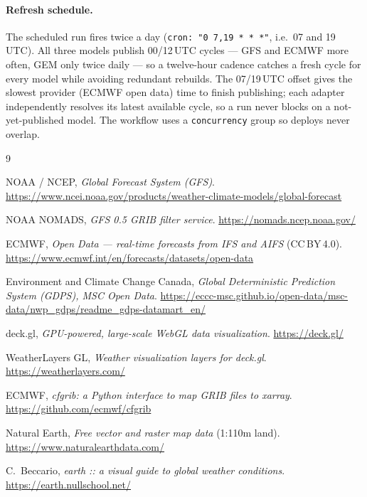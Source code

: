 \documentclass[11pt,letterpaper]{article}
\begin{document}
\paragraph{Refresh schedule.}
The scheduled run fires twice a day (\texttt{cron: "0 7,19 * * *"}, i.e.\ 07 and
19\,UTC). All three models publish 00/12\,UTC cycles --- GFS and ECMWF more often,
GEM only twice daily --- so a twelve-hour cadence catches a fresh cycle for every
model while avoiding redundant rebuilds. The 07/19\,UTC offset gives the slowest
provider (ECMWF open data) time to finish publishing; each adapter independently
resolves its latest available cycle, so a run never blocks on a not-yet-published
model. The workflow uses a \texttt{concurrency} group so deploys never overlap.

\begin{thebibliography}{9}

NOAA / NCEP, \emph{Global Forecast System (GFS)}.
\url{https://www.ncei.noaa.gov/products/weather-climate-models/global-forecast}

NOAA NOMADS, \emph{GFS 0.5\textdegree{} GRIB filter service}.
\url{https://nomads.ncep.noaa.gov/}

ECMWF, \emph{Open Data --- real-time forecasts from IFS and AIFS} (CC\,BY\,4.0).
\url{https://www.ecmwf.int/en/forecasts/datasets/open-data}

Environment and Climate Change Canada, \emph{Global Deterministic Prediction
System (GDPS), MSC Open Data}.
\url{https://eccc-msc.github.io/open-data/msc-data/nwp_gdps/readme_gdps-datamart_en/}

deck.gl, \emph{GPU-powered, large-scale WebGL data visualization}.
\url{https://deck.gl/}

WeatherLayers GL, \emph{Weather visualization layers for deck.gl}.
\url{https://weatherlayers.com/}

ECMWF, \emph{cfgrib: a Python interface to map GRIB files to xarray}.
\url{https://github.com/ecmwf/cfgrib}

Natural Earth, \emph{Free vector and raster map data} (1:110m land).
\url{https://www.naturalearthdata.com/}

C.\ Beccario, \emph{earth :: a visual guide to global weather conditions}.
\url{https://earth.nullschool.net/}

\end{thebibliography}
\end{document}
